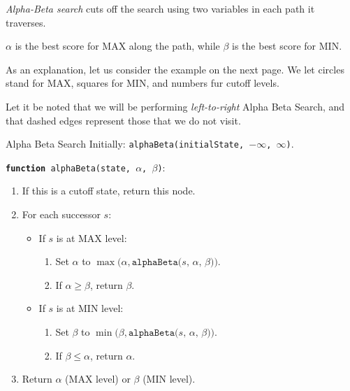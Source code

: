 \documentclass[english]{panikzettel}
\begin{document}
\begin{minipage}[t]{0.425\textwidth}
\emph{Alpha-Beta search} cuts off the search using two variables in each path it traverses.

$\alpha$ is the best score for MAX along the path, while $\beta$ is the best score for MIN.

As an explanation, let us consider the example on the next page. We let circles stand for MAX, squares for MIN, and numbers fur cutoff levels.

Let it be noted that we will be performing \emph{left-to-right} Alpha Beta Search, and that dashed edges represent those that we do not visit.

\end{minipage}\hspace{0.025\textwidth}%
\begin{minipage}[t]{0.55\textwidth}
\vspace{-\baselineskip}
\begin{algo}{Alpha Beta Search}
Initially: \texttt{alphaBeta(initialState, $-\infty$, $\infty$)}.
\medskip

\texttt{\textbf{function} alphaBeta(state, $\alpha$, $\beta$)}:
\begin{enumerate}
    \item If this is a cutoff state, return this node.
    \item For each successor $s$:
        \begin{itemize}
            \item If $s$ is at MAX level:
                \begin{enumerate}
                    \item Set $\alpha$ to $\max(\alpha, \texttt{alphaBeta($s$, $\alpha$, $\beta$))}$.
                    \item If $\alpha \geq \beta$, return $\beta$.
                \end{enumerate}
            \item If $s$ is at MIN level:
                \begin{enumerate}
                    \item Set $\beta$ to $\min(\beta, \texttt{alphaBeta($s$, $\alpha$, $\beta$))}$.
                    \item If $\beta \leq \alpha$, return $\alpha$.
                \end{enumerate}
        \end{itemize}
    \item Return $\alpha$ (MAX level) or $\beta$ (MIN level).
\end{enumerate}
\end{algo}
\end{minipage}
\end{document}
